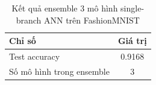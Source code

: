 \begin{table}[H]
\centering
\caption{Kết quả ensemble 3 mô hình single-branch ANN trên FashionMNIST}
\label{tab:fashion-mnist-ensemble-results}
\begin{tabular}{l c}
\toprule
Chỉ số & Giá trị \\
\midrule
Test accuracy & 0.9168 \\
Số mô hình trong ensemble & 3 \\
\bottomrule
\end{tabular}
\end{table}
